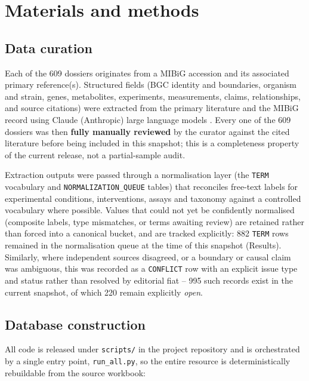 \section{Materials and methods}

\subsection{Data curation}

Each of the 609 dossiers originates from a MIBiG accession and its associated primary reference(s).
Structured fields (BGC identity and boundaries, organism and strain, genes, metabolites, experiments,
measurements, claims, relationships, and source citations) were extracted from the primary literature
and the MIBiG record using Claude (Anthropic) large language models
.
Every one of the 609 dossiers was then \textbf{fully manually reviewed} by the curator against the
cited literature before being included in this snapshot; this is a completeness property of the
current release, not a partial-sample audit.

Extraction outputs were passed through a normalisation layer (the \texttt{TERM} vocabulary and
\texttt{NORMALIZATION\_QUEUE} tables) that reconciles free-text labels for experimental conditions,
interventions, assays and taxonomy against a controlled vocabulary where possible. Values that could
not yet be confidently normalised (composite labels, type mismatches, or terms awaiting review) are
retained rather than forced into a canonical bucket, and are tracked explicitly: 882 \texttt{TERM}
rows remained in the normalisation queue at the time of this snapshot (Results). Similarly, where
independent sources disagreed, or a boundary or causal claim was ambiguous, this was recorded as a
\texttt{CONFLICT} row with an explicit issue type and status rather than resolved by editorial
fiat -- 995 such records exist in the current snapshot, of which 220 remain explicitly \emph{open}.

\subsection{Database construction}

All code is released under \texttt{scripts/} in the project repository and is orchestrated by a
single entry point, \texttt{run\_all.py}, so the entire resource is deterministically rebuildable
from the source workbook:

